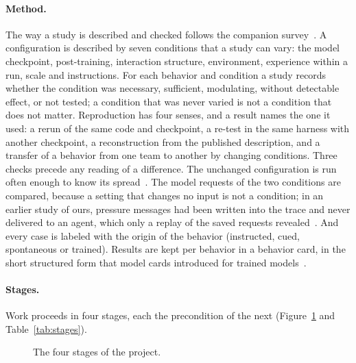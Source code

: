 \documentclass[11pt,a4paper]{article}
\begin{document}
\paragraph{Method.} The way a study is described and checked follows the companion
survey~\cite{yoo2026survey}. A configuration is described by seven conditions that a study can vary: the
model checkpoint, post-training, interaction structure, environment, experience within a run, scale and
instructions. For each behavior and condition a study records whether the condition was necessary,
sufficient, modulating, without detectable effect, or not tested; a condition that was never varied is not
a condition that does not matter. Reproduction has four senses, and a result names the one it used: a
rerun of the same code and checkpoint, a re-test in the same harness with another checkpoint, a
reconstruction from the published description, and a transfer of a behavior from one team to another by
changing conditions. Three checks precede any reading of a difference. The unchanged configuration is run
often enough to know its spread~\cite{henderson2018}. The model requests of the two conditions are
compared, because a setting that changes no input is not a condition; in an earlier study of ours, pressure
messages had been written into the trace and never delivered to an agent, which only a replay of the saved
requests revealed~\cite{yoo2026survey}. And every case is labeled with the origin of the behavior
(instructed, cued, spontaneous or trained). Results are kept per behavior in a behavior card, in the short
structured form that model cards introduced for trained models~\cite{mitchell2019}.

\paragraph{Stages.} Work proceeds in four stages, each the precondition of the next
(Figure~\ref{fig:stages} and Table~\ref{tab:stages}).

\begin{figure}[tbp]
\centering
{}
\caption{The four stages of the project.}
\label{fig:stages}
\end{figure}
\end{document}
